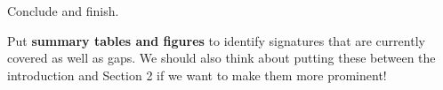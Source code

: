 Conclude and finish.

Put {\bf summary tables and figures} to identify signatures that are currently covered as well as gaps. We should also think about putting these between the introduction and Section 2 if we want to make them more prominent!